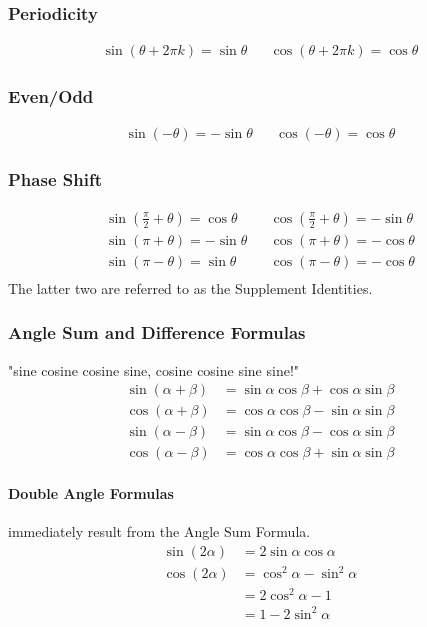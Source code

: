 \documentclass{article}
\begin{document}
\subsubsection{Periodicity}
\begin{align*}
    \sin{\left(\theta+2\pi k\right)} = \sin{\theta} &&
    \cos{\left(\theta+2\pi k\right)} = \cos{\theta}
\end{align*}
\subsubsection{Even/Odd}
\begin{align*}
    \sin{\left(-\theta\right)} = -\sin{\theta}&&
    \cos{\left(-\theta\right)} = \cos{\theta}
\end{align*}
\subsubsection{Phase Shift}
\begin{align*}
    \sin{\left(\frac{\pi}{2} + \theta\right)} = \cos{\theta} &&
    \cos{\left(\frac{\pi}{2} + \theta\right)} = -\sin{\theta}\\
    \sin{\left(\pi + \theta\right)} = -\sin{\theta} &&
    \cos{\left(\pi + \theta\right)} = -\cos{\theta}\\
    \sin{\left(\pi - \theta\right)} = \sin{\theta} &&
    \cos{\left(\pi - \theta\right)} = -\cos{\theta}\\
\end{align*}
The latter two are referred to as the Supplement Identities.

\subsubsection{Angle Sum and Difference Formulas} "sine cosine cosine sine, cosine cosine sine sine!"
\begin{align*}
    \sin{\left(\alpha+\beta\right)} &= \sin{\alpha}\cos{\beta}+\cos{\alpha}\sin{\beta}\\
    \cos{\left(\alpha+\beta\right)} &= \cos{\alpha}\cos{\beta}-\sin{\alpha}\sin{\beta}\\
    \sin{\left(\alpha-\beta\right)} &= \sin{\alpha}\cos{\beta}-\cos{\alpha}\sin{\beta}\\
    \cos{\left(\alpha-\beta\right)} &= \cos{\alpha}\cos{\beta}+\sin{\alpha}\sin{\beta}
\end{align*}
\paragraph{Double Angle Formulas} immediately result from the Angle Sum Formula.
\begin{align*}
    \sin{\left(2\alpha\right)} &= 2\sin{\alpha}\cos{\alpha}\\
    \cos{\left(2\alpha\right)} &= \cos^2{\alpha}-\sin^2{\alpha}\\
                                &= 2\cos^2{\alpha}-1\\
                                &= 1-2\sin^2{\alpha}
\end{align*}
\end{document}
